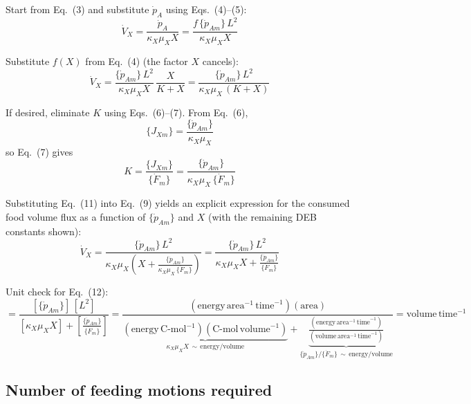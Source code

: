 \documentclass[11pt]{article}
\begin{document}
Start from Eq.~(3) and substitute $\dot p_A$ using Eqs.~(4)--(5):
\begin{equation}\tag{8}
  \dot V_X = \frac{\dot p_A}{\kappa_X\mu_X X} = \frac{f\,\{\dot p_{Am}\}\,L^2}{\kappa_X\mu_X X}
\end{equation}

Substitute $f(X)$ from Eq.~(4) (the factor $X$ cancels):
\begin{equation}\tag{9}
  \dot V_X = \frac{\{\dot p_{Am}\}\,L^2}{\kappa_X\mu_X X}\,\frac{X}{K+X} = \frac{\{\dot p_{Am}\}\,L^2}{\kappa_X\mu_X\,(K+X)}
\end{equation}

If desired, eliminate $K$ using Eqs.~(6)--(7). From Eq.~(6),
\begin{equation}
  \{J_{Xm}\} = \frac{\{\dot p_{Am}\}}{\kappa_X\mu_X}\tag{10}
\end{equation}
so Eq.~(7) gives
\begin{equation}
  K = \frac{\{J_{Xm}\}}{\{\dot F_m\}}
    = \frac{\{\dot p_{Am}\}}{\kappa_X\mu_X\,\{\dot F_m\}}\tag{11}
\end{equation}

Substituting Eq.~(11) into Eq.~(9) yields an explicit expression for the consumed food volume flux as a function of $\{\dot p_{Am}\}$ and $X$ (with the remaining DEB constants shown):
\begin{equation}\tag{12}
  \dot V_X = \frac{\{\dot p_{Am}\}\,L^2}{\kappa_X\mu_X\left(X + \frac{\{\dot p_{Am}\}}{\kappa_X\mu_X\,\{\dot F_m\}}\right)} = \frac{\{\dot p_{Am}\}\,L^2}{\kappa_X\mu_X X + \frac{\{\dot p_{Am}\}}{\{\dot F_m\}}}
\end{equation}

Unit check for Eq.~(12):
\begin{equation*}
  [\dot V_X] = \frac{[\{\dot p_{Am}\}]\,[L^2]}{[\kappa_X\mu_X X] + \left[\frac{\{\dot p_{Am}\}}{\{\dot F_m\}}\right]} = \frac{(\text{energy}\,\text{area}^{-1}\,\text{time}^{-1})(\text{area})}{\underbrace{(\text{energy}\,\text{C-mol}^{-1})(\text{C-mol}\,\text{volume}^{-1})}_{\kappa_X\mu_X X\,\sim\,\text{energy}/\text{volume}} + \underbrace{\frac{(\text{energy}\,\text{area}^{-1}\,\text{time}^{-1})}{(\text{volume}\,\text{area}^{-1}\,\text{time}^{-1})}}_{\{\dot p_{Am}\}/\{\dot F_m\}\,\sim\,\text{energy}/\text{volume}}} = \text{volume}\,\text{time}^{-1}
\end{equation*}

\subsection*{Number of feeding motions required}
\end{document}
